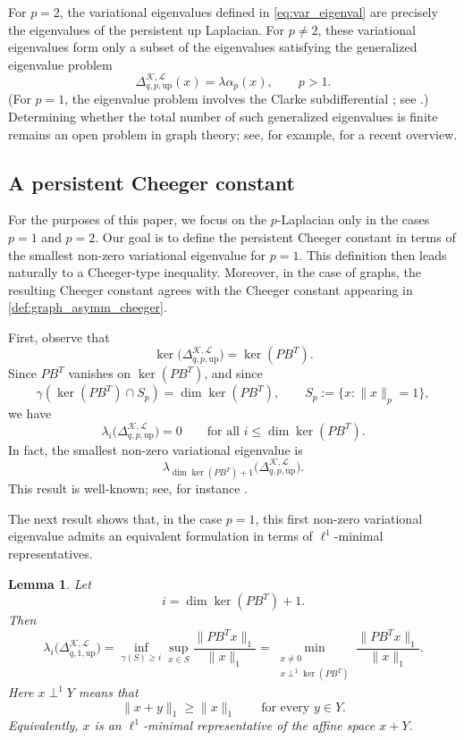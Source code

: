 \documentclass{article}
\newtheorem{lemma}{Lemma}[section]
\newcommand{\KK}{\mathcal{K}}
\newcommand{\LL}{\mathcal{L}}
\begin{document}
For \(p=2\), the variational eigenvalues defined in
\cref{eq:var_eigenval} are precisely the eigenvalues of the persistent up
Laplacian. For \(p\neq 2\), these variational eigenvalues form only a subset
of the eigenvalues satisfying the generalized eigenvalue problem
\[
\Delta_{q,p,\mathrm{up}}^{\KK,\LL}(x)
=
\lambda \alpha_p(x),
\qquad p>1.
\]
(For $p=1$, the eigenvalue problem involves the Clarke subdifferential \cite{clarke1990optimization}; see \cite{jost2024cheeger}.)
Determining whether the total number of such generalized eigenvalues is
finite remains an open problem in graph theory; see, for example,
\cite{deidda2025nonlinear} for a recent overview.

\subsection{A persistent Cheeger constant}\label{sec:JZ_cheeger_cnst}
For the purposes of this paper, we focus on the \(p\)-Laplacian only in the cases \(p=1\) and \(p=2\). Our goal is to define the persistent Cheeger constant in terms of the smallest non-zero variational eigenvalue for \(p=1\). This definition then leads naturally to a Cheeger-type inequality. Moreover, in the case of graphs, the resulting Cheeger constant agrees with the Cheeger constant appearing in \cref{def:graph_asymm_cheeger}.

First, observe that
\[
\ker\bigl(\Delta_{q,p,\mathrm{up}}^{\KK,\LL}\bigr)
=
\ker(PB^T).
\]
Since \(PB^T\) vanishes on \(\ker(PB^T)\), and since
\[
\gamma(\ker(PB^T)\cap S_p)=\dim \ker(PB^T),
\qquad
S_p:=\{x:\|x\|_p=1\},
\]
we have
\[
\lambda_i\bigl(\Delta_{q,p,\mathrm{up}}^{\KK,\LL}\bigr)=0
\qquad
\text{for all } i\leq \dim \ker(PB^T).
\]
In fact, the smallest non-zero variational eigenvalue is
\[
\lambda_{\dim \ker(PB^T)+1}
\bigl(\Delta_{q,p,\mathrm{up}}^{\KK,\LL}\bigr).
\]
This result is well-known; see, for instance \cite[Section 2]{tudisco2022nonlinear}.

The next result shows that, in the case \(p=1\), this first non-zero
variational eigenvalue admits an equivalent formulation in terms of
\(\ell^1\)-minimal representatives. 

\begin{lemma}
\label{lem:p1cheeger_equiv}
Let
\[
i=\dim\ker(PB^T)+1.
\]
Then
\[
\lambda_i\bigl(\Delta_{q,1,\mathrm{up}}^{\KK,\LL}\bigr)
=
\inf_{\gamma(S)\geq i}
\sup_{x\in S}
\frac{\|PB^T x\|_1}{\|x\|_1}
=
\min_{\substack{x\neq 0\\ x\perp^1\ker(PB^T)}}
\frac{\|PB^T x\|_1}{\|x\|_1}.
\]
Here \(x\perp^1 Y\) means that
\[
\|x+y\|_1\geq \|x\|_1
\qquad
\text{for every } y\in Y.
\]
Equivalently, \(x\) is an \(\ell^1\)-minimal representative of the affine
space \(x+Y\).
\end{lemma}
\end{document}
